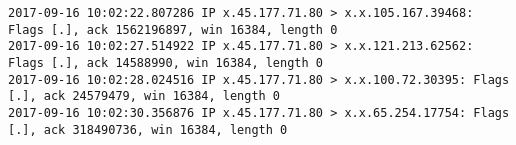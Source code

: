 \begin{lstlisting}
2017-09-16 10:02:22.807286 IP x.45.177.71.80 > x.x.105.167.39468: Flags [.], ack 1562196897, win 16384, length 0
2017-09-16 10:02:27.514922 IP x.45.177.71.80 > x.x.121.213.62562: Flags [.], ack 14588990, win 16384, length 0
2017-09-16 10:02:28.024516 IP x.45.177.71.80 > x.x.100.72.30395: Flags [.], ack 24579479, win 16384, length 0
2017-09-16 10:02:30.356876 IP x.45.177.71.80 > x.x.65.254.17754: Flags [.], ack 318490736, win 16384, length 0
\end{lstlisting}
